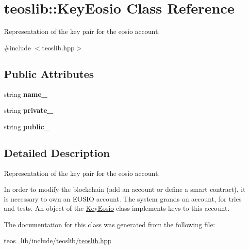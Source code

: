\hypertarget{classteoslib_1_1_key_eosio}{}\section{teoslib\+:\+:Key\+Eosio Class Reference}
\label{classteoslib_1_1_key_eosio}


Representation of the key pair for the eosio account.  




{\ttfamily \#include $<$teoslib.\+hpp$>$}

\subsection*{Public Attributes}
\begin{DoxyCompactItemize}
\item 
\mbox{\label{classteoslib_1_1_key_eosio_a93b5e7301d06888400b17fef7fcf5d51}} 
string {\bfseries name\+\_\+}
\item 
\mbox{\label{classteoslib_1_1_key_eosio_a431a821c417f1171a281a0c6cc93cd40}} 
string {\bfseries private\+\_\+}
\item 
\mbox{\label{classteoslib_1_1_key_eosio_a5eb1eb0758e157d483d3ff427a943c43}} 
string {\bfseries public\+\_\+}
\end{DoxyCompactItemize}


\subsection{Detailed Description}
Representation of the key pair for the eosio account. 

In order to modify the blockchain (add an account or define a smart contract), it is necessary to own an E\+O\+S\+IO account. The system grands an account, for tries and tests. An object of the \mbox{\hyperlink{classteoslib_1_1_key_eosio}{Key\+Eosio}} class implements keys to this account. 

The documentation for this class was generated from the following file\+:\begin{DoxyCompactItemize}
\item 
teos\+\_\+lib/include/teoslib/\mbox{\hyperlink{teoslib_8hpp}{teoslib.\+hpp}}\end{DoxyCompactItemize}
